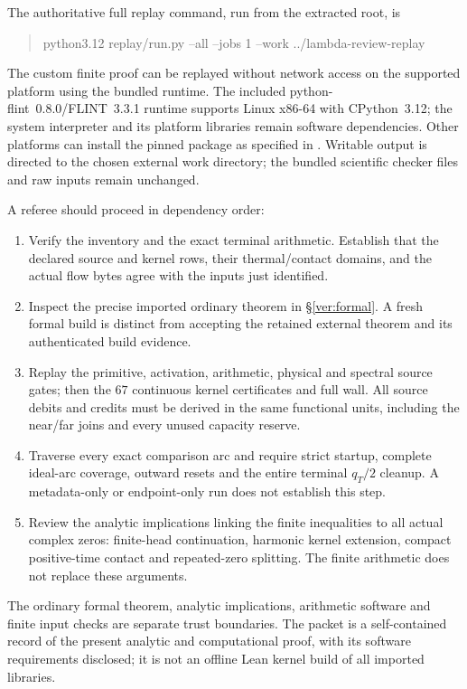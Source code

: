 \documentclass[11pt,a4paper]{article}
\theoremstyle{definition}
\theoremstyle{remark}
\begin{document}
The authoritative full replay command, run from the extracted root, is
\begin{quote}\small\ttfamily
python3.12 replay/run.py --all --jobs 1 --work ../lambda-review-replay
\end{quote}
The custom finite proof can be replayed without network access on the
supported platform using the bundled runtime. The included
python-flint~0.8.0/FLINT~3.3.1 runtime supports
Linux x86-64 with CPython~3.12; the system interpreter and its platform
libraries remain software dependencies. Other platforms can install
the pinned package as specified in .
Writable output is directed to the chosen external work directory;
the bundled scientific checker files and raw inputs remain unchanged.

A referee should proceed in dependency order:
\begin{enumerate}
\item Verify the inventory and the exact terminal arithmetic. Establish
that the declared source and kernel rows, their thermal/contact domains,
and the actual flow bytes agree with the inputs just identified.
\item Inspect the precise imported ordinary theorem in
\S\ref{ver:formal}. A fresh formal build is distinct from accepting the
retained external theorem and its authenticated build evidence.
\item Replay the primitive, activation, arithmetic, physical and spectral
source gates; then the $67$ continuous kernel certificates and full wall.
All source debits and credits must be derived in the same functional
units, including the near/far joins and every unused capacity reserve.
\item Traverse every exact comparison arc and require strict startup,
complete ideal-arc coverage, outward resets and the entire terminal
$q_T/2$ cleanup. A metadata-only or endpoint-only run does not establish
this step.
\item Review the analytic implications linking the finite inequalities
to all actual complex zeros: finite-head continuation, harmonic kernel
extension, compact positive-time contact and repeated-zero splitting.
The finite arithmetic does not replace these arguments.
\end{enumerate}
The ordinary formal theorem, analytic implications, arithmetic software
and finite input checks are separate trust boundaries. The packet is a
self-contained record of the present analytic and computational proof,
with its software requirements disclosed; it is not an offline Lean
kernel build of all imported libraries.
\end{document}

